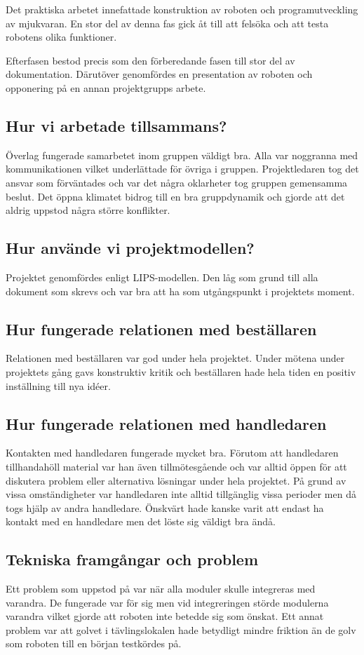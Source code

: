 \documentclass[11pt]{article}
\begin{document}
Det praktiska arbetet innefattade konstruktion av roboten och programutveckling av mjukvaran. En stor del av denna fas gick åt till att felsöka och att testa robotens olika funktioner. 

Efterfasen bestod precis som den förberedande fasen till stor del av dokumentation. Därutöver genomfördes en presentation av roboten och opponering på en annan projektgrupps arbete.

\subsection{Hur vi arbetade tillsammans?}
Överlag fungerade samarbetet inom gruppen väldigt bra. Alla var noggranna med kommunikationen vilket underlättade för övriga i gruppen. Projektledaren tog det ansvar som förväntades och var det några oklarheter tog gruppen gemensamma beslut. Det öppna klimatet bidrog till en bra gruppdynamik och gjorde att det aldrig uppstod några större konflikter.

\subsection{Hur använde vi projektmodellen?} 
Projektet genomfördes enligt LIPS-modellen. Den låg som grund till alla dokument som skrevs och var bra att ha som utgångspunkt i projektets moment. 

\subsection{Hur fungerade relationen med beställaren}
Relationen med beställaren var god under hela projektet. Under mötena under projektets gång gavs konstruktiv kritik och beställaren hade hela tiden en positiv inställning till nya idéer. 

\subsection{Hur fungerade relationen med handledaren}
Kontakten med handledaren fungerade mycket bra. Förutom att handledaren tillhandahöll material var han även  tillmötesgående och var alltid öppen för att diskutera problem eller alternativa lösningar under hela projektet. På grund av vissa omständigheter var handledaren inte alltid tillgänglig vissa perioder men då togs hjälp av andra handledare. Önskvärt hade kanske varit att endast ha kontakt med en handledare men det löste sig väldigt bra ändå.

\subsection{Tekniska framgångar och problem}
Ett problem som uppstod på var när alla moduler skulle integreras med varandra. De fungerade var för sig men vid integreringen störde modulerna varandra vilket gjorde att roboten inte betedde sig som önskat. Ett annat problem var att golvet i tävlingslokalen hade betydligt mindre friktion än de golv som roboten till en början testkördes på. 
\end{document}

